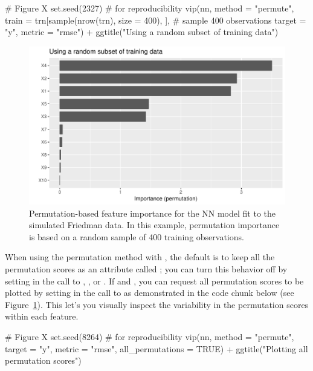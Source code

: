 \begin{example}
# Figure X
set.seed(2327)  # for reproducibility
vip(nn, method = "permute", 
    train = trn[sample(nrow(trn), size = 400), ],  # sample 400 observations
    target = "y", metric = "rmse") +
  ggtitle("Using a random subset of training data")
\end{example}

\begin{figure}[!htb]
  \centering
  \includegraphics[width=1\linewidth]{figures/vip-permute-nn-sample}
  \caption{Permutation-based feature importance for the NN model fit to the simulated Friedman data. In this example, permutation importance is based on a random sample of 400 training observations.}
  \label{fig:vip-nn-mae}
\end{figure}

When using the permutation method with , the default is to keep all the permutation scores as an attribute called ; you can turn this behavior off by setting  in the call to , , or . If  and , you can request all permutation scores to be plotted by setting  in the call to  as demonstrated in the code chunk below (see Figure~\ref{fig:vip-nn-mae}). This let's you visually inspect the variability in the permutation scores within each feature.

\begin{example}
# Figure X
set.seed(8264)  # for reproducibility
vip(nn, method = "permute", target = "y", metric = "rmse",
    all_permutations = TRUE) +
  ggtitle("Plotting all permutation scores")
\end{example}


